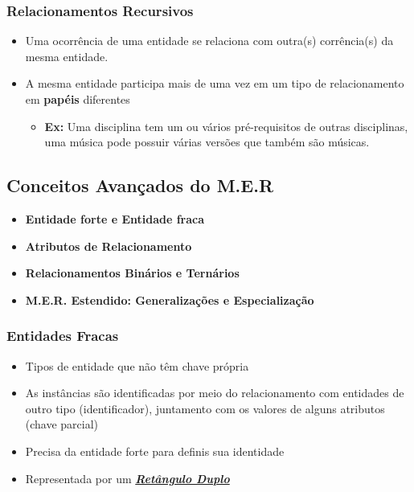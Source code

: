 \documentclass[12pt,a4paper]{article}
\begin{document}
\subsubsection{Relacionamentos Recursivos}
\begin{itemize}
    \item
        Uma ocorrência de uma entidade se relaciona com outra(s) corrência(s) da mesma entidade.
    \item 
        A mesma entidade participa mais de uma vez em um tipo de relacionamento em \textbf{papéis} diferentes
        \begin{itemize}
            \item
                \textbf{Ex:} Uma disciplina tem um ou vários pré-requisitos de outras disciplinas, uma música pode possuir várias versões que também são músicas.
        \end{itemize}
\end{itemize}

\subsection{Conceitos Avançados do M.E.R}
\begin{itemize}
    \item \textbf{Entidade forte e Entidade fraca}
    \item \textbf{Atributos de Relacionamento}
    \item \textbf{Relacionamentos Binários e Ternários}
    \item \textbf{M.E.R. Estendido: Generalizações e Especialização}
\end{itemize}

\subsubsection{Entidades Fracas}
\begin{itemize}
    \item Tipos de entidade que não têm chave própria
    \item As instâncias são identificadas por meio do relacionamento com entidades de outro tipo (identificador), juntamento com os valores de alguns atributos (chave parcial)
    \item Precisa da entidade forte para definis sua identidade
    \item Representada por um \textbf{\textit{\underline{Retângulo Duplo}}}
\end{itemize}
\end{document}
